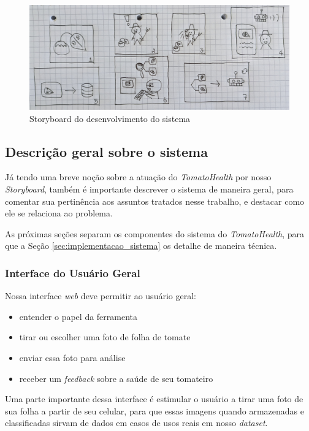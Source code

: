 \begin{figure}[ht]
    \centering
    \includegraphics[width=\textwidth]{images/storyboard.jpg}
    \caption{Storyboard do desenvolvimento do sistema}
    \label{fig:storyboard}
\end{figure}

\subsection{{Descrição geral sobre o sistema}}

Já tendo uma breve noção sobre a atuação do \emph{TomatoHealth} por nosso \textit{Storyboard}, também é importante descrever o sistema de maneira geral, para comentar sua pertinência aos assuntos tratados nesse trabalho, e destacar como ele se relaciona ao problema.

As próximas seções separam os componentes do sistema do \emph{TomatoHealth}, para que a Seção \ref{sec:implementacao_sistema} os detalhe de maneira técnica.

\subsubsection{{Interface do Usuário Geral} \label{sec:abst-geral}}

Nossa interface \textit{web} deve permitir ao usuário geral:

\begin{itemize}
    \item entender o papel da ferramenta
    \item tirar ou escolher uma foto de folha de tomate
    \item enviar essa foto para análise
    \item receber um \textit{feedback} sobre a saúde de seu tomateiro
\end{itemize}

Uma parte importante dessa interface é estimular o usuário a tirar uma foto de sua folha a partir de seu celular, para que essas imagens quando armazenadas e classificadas sirvam de dados em casos de usos reais em nosso \textit{dataset}.

